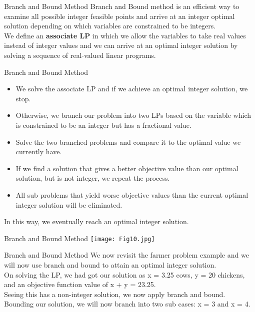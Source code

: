 \documentclass[9pt]{beamer}
\begin{document}
\begin{frame}{Branch and Bound Method}
Branch and Bound method is an efficient way to examine all possible integer feasible points and arrive at an integer optimal solution depending on which variables are constrained to be integers. \\
\vspace{1cm}
\pause
We define an \textbf{associate LP} in which we allow the variables to take real values instead of integer values and we can arrive at an optimal integer solution by solving a sequence of real-valued linear programs.
\end{frame}

\begin{frame}{Branch and Bound Method}
\begin{itemize}
    \item We solve the associate LP and if we achieve an optimal integer solution, we stop.
    \pause
    \item Otherwise, we branch our problem into two LPs based on the variable which is constrained to be an integer but has a fractional value. 
    \pause
    \item Solve the two branched problems and compare it to the optimal value we currently have.
    \pause
    \item If we find a solution that gives a better objective value than our optimal solution, but is not integer, we repeat the process.
    \pause
    \item All sub problems that yield worse objective values than the current optimal integer solution will be eliminated.
\end{itemize}
In this way, we eventually reach an optimal integer solution.
\end{frame}

\begin{frame}{Branch and Bound Method}
\centering
\texttt{[image: Fig10.jpg]}
\end{frame}

\begin{frame}{Branch and Bound Method}
We now revisit the farmer problem example and we will now use branch and bound to attain an optimal integer solution.\\
\vspace{0.2cm}
\pause
On solving the LP, we had got our solution as x = 3.25 cows, y = 20 chickens, and an objective function value of x + y = 23.25.\\
\vspace{0.2cm}
\pause
Seeing this has a non-integer solution, we now apply branch and bound. Bounding our solution, we will now branch into two sub cases: x = 3 and x = 4.
\end{frame}
\end{document}
